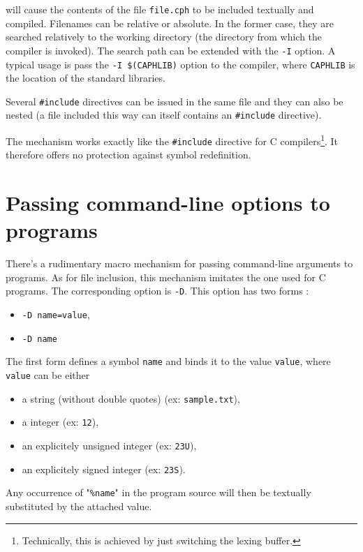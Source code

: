 will cause the contents of the file \verb|file.cph| to be included textually and compiled.
Filenames can be relative or absolute. In the former case, they are searched relatively to the
working directory (the directory from which the \caph compiler is invoked). The search path can be
extended with the \verb|-I| option. A typical usage is pass the \verb|-I $(CAPHLIB)| option to the
compiler, where \verb|CAPHLIB| is the location of the standard libraries.

Several \verb|#include| directives can be issued in the same file and they can also be nested (a
file included this way can itself contains an \verb|#include| directive).

\medskip 
The mechanism works exactly like the \verb|#include| directive for C compilers\footnote{Technically,
  this is achieved by just switching the lexing buffer.}. It therefore offers no protection against
symbol redefinition. 

\section{Passing command-line options to programs}
\label{sec:passing-cl-options}

There's a rudimentary macro mechanism for passing command-line arguments to programs. As for file
inclusion, this mechanism imitates the one used for C programs. The corresponding option is
\verb|-D|. This option has two forms :

\begin{itemize}
\item \verb|-D name=value|,
\item \verb|-D name|
\end{itemize}

The first form defines a symbol \verb|name| and binds it to the value \verb|value|, where
\verb|value| can be either 
\begin{itemize}
\item a string (without double quotes) (ex: \verb|sample.txt|),
\item a integer (ex: \verb|12|),
\item an explicitely unsigned integer (ex: \verb|23U|), 
\item an explicitely signed integer (ex: \verb|23S|). 
\end{itemize}

Any occurrence of "\verb|%name|" in the program source will then be textually substituted by the attached value.

